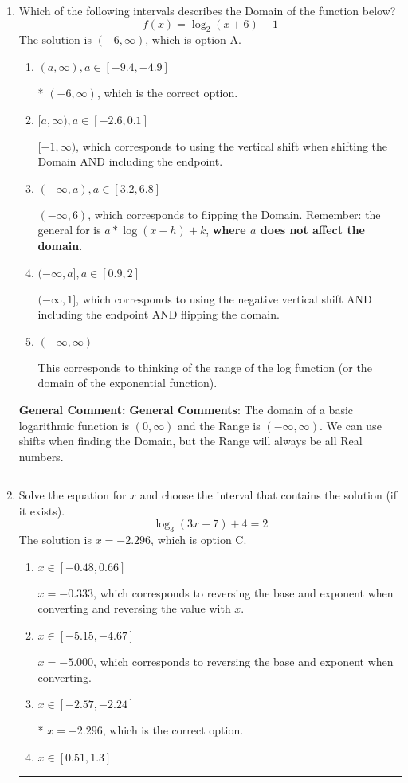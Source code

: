 \documentclass{extbook}[14pt]
\newcommand{\litem}[1]{\item #1

\rule{\textwidth}{0.4pt}}
\begin{document}
\begin{enumerate}\litem{
Which of the following intervals describes the Domain of the function below?
\[ f(x) = \log_2{(x+6)}-1 \]The solution is \( (-6, \infty) \), which is option A.\begin{enumerate}[label=\Alph*.]
\item \( (a, \infty), a \in [-9.4, -4.9] \)

* $(-6, \infty)$, which is the correct option.
\item \( [a, \infty), a \in [-2.6, 0.1] \)

$[-1, \infty)$, which corresponds to using the vertical shift when shifting the Domain AND including the endpoint.
\item \( (-\infty, a), a \in [3.2, 6.8] \)

$(-\infty, 6)$, which corresponds to flipping the Domain. Remember: the general for is $a*\log(x-h)+k$, \textbf{where $a$ does not affect the domain}.
\item \( (-\infty, a], a \in [0.9, 2] \)

$(-\infty, 1]$, which corresponds to using the negative vertical shift AND including the endpoint AND flipping the domain.
\item \( (-\infty, \infty) \)

This corresponds to thinking of the range of the log function (or the domain of the exponential function).
\end{enumerate}

\textbf{General Comment:} \textbf{General Comments}: The domain of a basic logarithmic function is $(0, \infty)$ and the Range is $(-\infty, \infty)$. We can use shifts when finding the Domain, but the Range will always be all Real numbers.
}
\litem{
Solve the equation for $x$ and choose the interval that contains the solution (if it exists).
\[ \log_{3}{(3x+7)}+4 = 2 \]The solution is \( x = -2.296 \), which is option C.\begin{enumerate}[label=\Alph*.]
\item \( x \in [-0.48, 0.66] \)

$x = -0.333$, which corresponds to reversing the base and exponent when converting and reversing the value with $x$.
\item \( x \in [-5.15, -4.67] \)

$x = -5.000$, which corresponds to reversing the base and exponent when converting.
\item \( x \in [-2.57, -2.24] \)

* $x = -2.296$, which is the correct option.
\item \( x \in [0.51, 1.3] \)


\end{enumerate}}
\end{enumerate}
\end{document}
